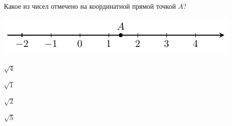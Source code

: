 \begin{ex}[type=none]
	\begin{condition}
		Какое из чисел отмечено на координатной прямой точкой $A$?
		\begin{center}
		\includegraphics{graphs/graph_5/graph_5}
		\end{center}
		
		\selectanswer
		\begin{enumcols}[itemcolumns=4]
			\item $\sqrt{4}$
			\item $\sqrt{1}$
			\item $\sqrt{2}$
			\item $\sqrt{5}$
		\end{enumcols}
	\end{condition}
\end{ex}